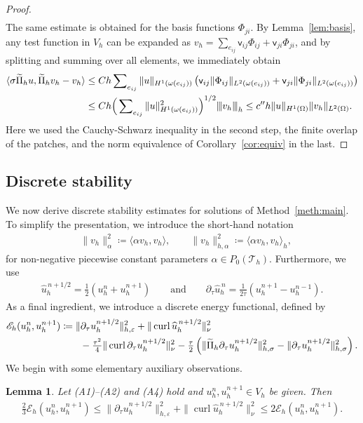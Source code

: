 \documentclass[12pt,reqno,a4paper]{amsart}
\newtheorem{lemma}{Lemma}[section]
\theoremstyle{definition}
\def\Th{\mathcal{T}_h}
\def\EE{\mathscr{E}}
\def\dtau{\partial_{\tau}}
\def\curl{\operatorname{curl}}
\def\wPi{\widetilde\Pi}
\def\Th{\mathcal{T}_h}
\def\v{{v}}
\def\wh{\widehat}
\def\ttv{\mathsf{v}}
\def\eps{\varepsilon}
\def\la{\langle}
\def\ra{\rangle}
\newcommand{\vertiii}[1]{{\left\vert\kern-0.25ex\left\vert\kern-0.25ex\left\vert #1 
    \right\vert\kern-0.25ex\right\vert\kern-0.25ex\right\vert}}
\begin{document}
\begin{proof}
\begin{align*}
\end{align*}
The same estimate is obtained for the basis functions $\Phi_{ji}$. 
By Lemma~\ref{lem:basis}, any test function in $V_h$ can be expanded as $v_h=\sum_{e_{ij}}\ttv_{ij}\Phi_{ij}+\ttv_{ji}\Phi_{ji}$, and by splitting and summing over all elements, we immediately obtain
\begin{align*}
\la\sigma\wPi_h u,\wPi_h\v_h-\v_h\ra
&\le C  h \sum\nolimits_{e_{ij}} \|u\|_{H^1(\omega(e_{ij}))} \left(\ttv_{ij}\|\Phi_{ij}\|_{L^2(\omega(e_{ij}))}+\ttv_{ji}\|\Phi_{ji}\|_{L^2(\omega(e_{ij}))}\right) \\
&\le C h \Big(\sum\nolimits_{e_{ij}}\|u\|^2_{H^1(\omega(e_{ij}))}\Big)^{1/2} \vertiii{v_h}_h \le c'' h \|u\|_{H^1(\Omega)} \|v_h\|_{L^2(\Omega)}.
\end{align*}
Here we used the Cauchy-Schwarz inequality in the second step, the finite overlap of the patches, and the norm equivalence of Corollary~\ref{cor:equiv} in the last. 
\end{proof}




\subsection{Discrete stability}

We now derive discrete stability estimates for solutions of Method~\ref{meth:main}. 
To simplify the presentation, we introduce the short-hand notation
\begin{align*}
&\|\v_h\|^2_{\alpha} \coloneqq \la\alpha \v_h,\v_h\ra,\qquad
\|\v_h\|^2_{h,\alpha} \coloneqq \la\alpha \v_h,\v_h\ra_h,
\end{align*}
for non-negative piecewise constant parameters $\alpha \in P_0(\Th)$. 
Furthermore, we use 
\begin{align}
\widehat u_h^{\,n+1/2} = \tfrac{1}{2}(u_h^n + u_h^{n+1}) 
\qquad \text{and} \qquad 
\dtau \widehat u_h^{\,n} = \tfrac{1}{2\tau}(u_h^{n+1} - u_h^{n-1}).
\end{align}
As a final ingredient, we introduce a discrete energy functional, defined by
\begin{align} \label{eq:energy}
\EE_h(u_h^n,u_h^{n+1}) &\coloneqq \|\dtau u_h^{n+1/2}\|_{h,\eps}^2 + \|\curl \wh u_h^{\,n+1/2}\|^2_{\nu} \\ 
&\qquad- \tfrac{\tau^2}{4}\|\curl\dtau u_h^{n+1/2}\|^2_{\nu} - \tfrac\tau2\left(\| \wPi_h \dtau u_h^{n+1/2}\|_{h,\sigma}^2-\|\dtau u_h^{n+1/2}\|_{h,\sigma}^2\right). \notag
\end{align} 
We begin with some elementary auxiliary observations. 
\begin{lemma}
Let (A1)--(A2) and (A4) hold and $u_h^n,u_h^{n+1} \in V_h$ be given. 
Then
\begin{align} \label{eq:equiv2}
\tfrac23\EE_h(u_h^n,u_h^{n+1}) \le \|\dtau u_h^{n+1/2}\|_{h,\eps}^2 + \|\curl \wh u_h^{\,n+1/2}\|^2_{\nu} \le 2\EE_h(u_h^n,u_h^{n+1}).
\end{align}
\end{lemma}
\end{document}
